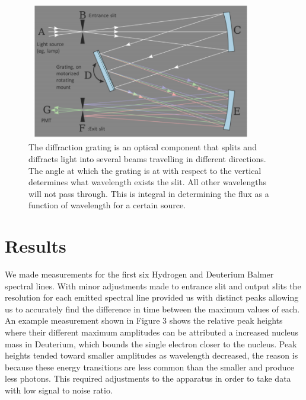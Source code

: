 \documentclass{article}
\begin{document}
\begin{figure}[H]
\begin{center}
  \includegraphics[height = 6cm, width=10cm]{specDiagram.png}
  \caption{The diffraction grating is an optical component that splits and diffracts light into several beams travelling in different directions. The angle at which the grating is at with respect to the vertical determines what wavelength exists the slit. All other wavelengths will not pass through. This is integral in determining the flux as a function of wavelength for a certain source.}
  \label{fig:boat1}
\end{center}
\end{figure}


\section{Results}
We made measurements for the first six Hydrogen and Deuterium Balmer spectral lines. With minor adjustments made to entrance slit and output slits the resolution for each emitted spectral line provided us with distinct peaks allowing us to accurately find the difference in time between the maximum values of each. An example measurement shown in Figure 3 shows the relative peak heights where their different maximum amplitudes can be attributed a increased nucleus mass in Deuterium, which bounds the single electron closer to the nucleus. Peak heights tended toward smaller amplitudes as wavelength decreased, the reason is because these energy transitions are less common than the smaller and produce less photons. This required adjustments to the apparatus in order to take data with low signal to noise ratio.
\end{document}
